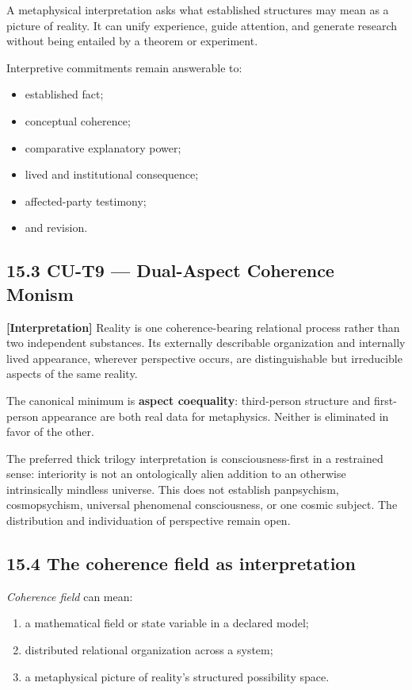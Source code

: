\documentclass[
  11pt,
]{article}
\providecommand{\tightlist}{%
  \setlength{\itemsep}{0pt}\setlength{\parskip}{0pt}}
\begin{document}
A metaphysical interpretation asks what established structures may mean
as a picture of reality. It can unify experience, guide attention, and
generate research without being entailed by a theorem or experiment.

Interpretive commitments remain answerable to:

\begin{itemize}
\tightlist
\item
  established fact;
\item
  conceptual coherence;
\item
  comparative explanatory power;
\item
  lived and institutional consequence;
\item
  affected-party testimony;
\item
  and revision.
\end{itemize}

\subsection{15.3 CU-T9 --- Dual-Aspect Coherence
Monism}\label{cu-t9-dual-aspect-coherence-monism}

\textbf{{[}Interpretation{]}} Reality is one coherence-bearing
relational process rather than two independent substances. Its
externally describable organization and internally lived appearance,
wherever perspective occurs, are distinguishable but irreducible aspects
of the same reality.

The canonical minimum is \textbf{aspect coequality}: third-person
structure and first-person appearance are both real data for
metaphysics. Neither is eliminated in favor of the other.

The preferred thick trilogy interpretation is consciousness-first in a
restrained sense: interiority is not an ontologically alien addition to
an otherwise intrinsically mindless universe. This does not establish
panpsychism, cosmopsychism, universal phenomenal consciousness, or one
cosmic subject. The distribution and individuation of perspective remain
open.

\subsection{15.4 The coherence field as
interpretation}\label{the-coherence-field-as-interpretation}

\emph{Coherence field} can mean:

\begin{enumerate}
\def\labelenumi{\arabic{enumi}.}
\tightlist
\item
  a mathematical field or state variable in a declared model;
\item
  distributed relational organization across a system;
\item
  a metaphysical picture of reality's structured possibility space.
\end{enumerate}
\end{document}
